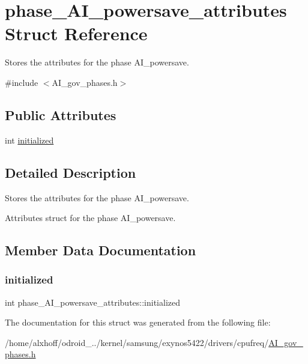 \hypertarget{structphase__AI__powersave__attributes}{}\section{phase\+\_\+\+A\+I\+\_\+powersave\+\_\+attributes Struct Reference}
\label{structphase__AI__powersave__attributes}


Stores the attributes for the phase A\+I\+\_\+powersave.  




{\ttfamily \#include $<$A\+I\+\_\+gov\+\_\+phases.\+h$>$}

\subsection*{Public Attributes}
\begin{DoxyCompactItemize}
\item 
int \hyperlink{structphase__AI__powersave__attributes_a88b5fd6834c3fef2e5cef8c616d999ab}{initialized}
\end{DoxyCompactItemize}


\subsection{Detailed Description}
Stores the attributes for the phase A\+I\+\_\+powersave. 

Attributes struct for the phase A\+I\+\_\+powersave. 

\subsection{Member Data Documentation}
\mbox{\label{structphase__AI__powersave__attributes_a88b5fd6834c3fef2e5cef8c616d999ab}} 
\subsubsection{\texorpdfstring{initialized}{initialized}}
{\footnotesize\ttfamily int phase\+\_\+\+A\+I\+\_\+powersave\+\_\+attributes\+::initialized}



The documentation for this struct was generated from the following file\+:\begin{DoxyCompactItemize}
\item 
/home/alxhoff/odroid\+\_../kernel/samsung/exynos5422/drivers/cpufreq/\hyperlink{AI__gov__phases_8h}{A\+I\+\_\+gov\+\_\+phases.\+h}\end{DoxyCompactItemize}
